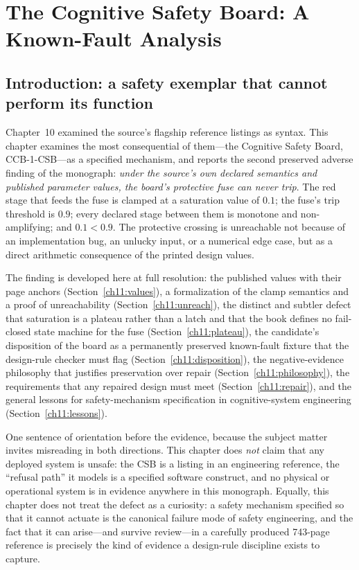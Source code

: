 \chapter{The Cognitive Safety Board: A Known-Fault Analysis}\label{ch11:main}

\section{Introduction: a safety exemplar that cannot perform its function}\label{ch11:intro}

Chapter~10 examined the source's flagship reference listings as syntax. This chapter examines the most consequential of them---the Cognitive Safety Board, CCB-1-CSB---as a specified mechanism, and reports the second preserved adverse finding of the monograph: \emph{under the source's own declared semantics and published parameter values, the board's protective fuse can never trip}. The red stage that feeds the fuse is clamped at a saturation value of $0.1$; the fuse's trip threshold is $0.9$; every declared stage between them is monotone and non-amplifying; and $0.1<0.9$. The protective crossing is unreachable not because of an implementation bug, an unlucky input, or a numerical edge case, but as a direct arithmetic consequence of the printed design values.

The finding is developed here at full resolution: the published values with their page anchors (Section~\ref{ch11:values}), a formalization of the clamp semantics and a proof of unreachability (Section~\ref{ch11:unreach}), the distinct and subtler defect that saturation is a plateau rather than a latch and that the book defines no fail-closed state machine for the fuse (Section~\ref{ch11:plateau}), the candidate's disposition of the board as a permanently preserved known-fault fixture that the design-rule checker must flag (Section~\ref{ch11:disposition}), the negative-evidence philosophy that justifies preservation over repair (Section~\ref{ch11:philosophy}), the requirements that any repaired design must meet (Section~\ref{ch11:repair}), and the general lessons for safety-mechanism specification in cognitive-system engineering (Section~\ref{ch11:lessons}).

One sentence of orientation before the evidence, because the subject matter invites misreading in both directions. This chapter does \emph{not} claim that any deployed system is unsafe: the CSB is a listing in an engineering reference, the ``refusal path'' it models is a specified software construct, and no physical or operational system is in evidence anywhere in this monograph. Equally, this chapter does not treat the defect as a curiosity: a safety mechanism specified so that it cannot actuate is the canonical failure mode of safety engineering, and the fact that it can arise---and survive review---in a carefully produced 743-page reference is precisely the kind of evidence a design-rule discipline exists to capture.

